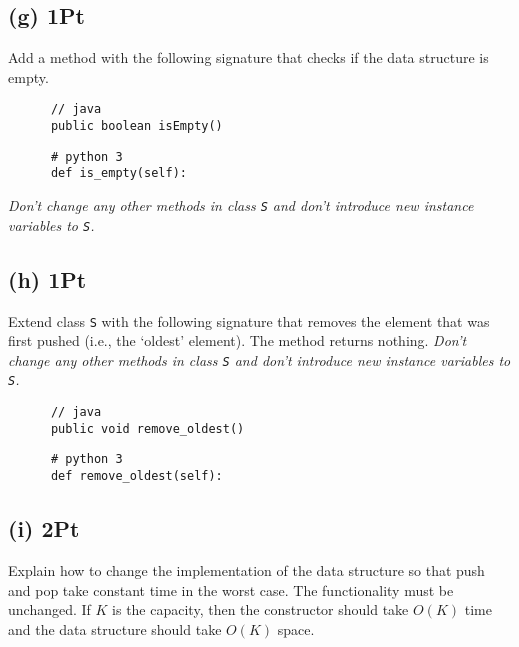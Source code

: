 \documentclass{tufte-handout}
\begin{document}
      \subsection*{(g) 1Pt}
     Add a method with the following signature that checks if the data structure is empty.

      \begin{minipage}{6cm}
      \begin{verbatim}
      // java
      public boolean isEmpty()
      \end{verbatim}
      \end{minipage}
%
      \begin{minipage}{6cm}
      \begin{verbatim}
      # python 3
      def is_empty(self):
      \end{verbatim}
      \end{minipage}

    \emph{Don't change any other methods in class {\tt S} and don't introduce new instance variables to {\tt S}.}
     
      \subsection*{(h) 1Pt}
      Extend class {\tt S} with the following signature that removes the element that was first pushed (i.e., the `oldest' element).
      The method returns nothing.
    \emph{Don't change any other methods in class {\tt S} and don't introduce new instance variables to {\tt S}.}

    \medskip
      \begin{minipage}{6cm}
      \begin{verbatim}
      // java
      public void remove_oldest()
      \end{verbatim}
      \end{minipage}
%
      \begin{minipage}{6cm}
      \begin{verbatim}
      # python 3
      def remove_oldest(self):
      \end{verbatim}
      \end{minipage}

      \subsection*{(i) 2Pt}
      Explain how to change the implementation of the data structure so that push and pop take constant time in the worst case.
      The functionality must be unchanged.
      If $K$ is the capacity, then the constructor should take $O(K)$ time and the data structure should take $O(K)$ space.
\end{document}

